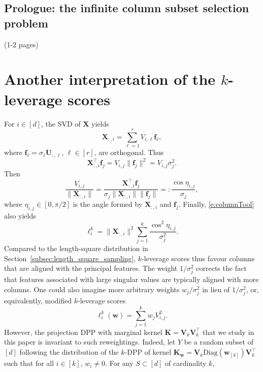 \documentclass[twoside,11pt]{book}
\numberwithin{theorem}{chapter}
\numberwithin{definition}{chapter}
\numberwithin{proposition}{chapter}
\numberwithin{corollary}{chapter}
\numberwithin{example}{chapter}
\numberwithin{lemma}{chapter}
\numberwithin{assumption}{chapter}
\DeclareMathOperator{\Tran}{\intercal}
\begin{document}
\subsection{Prologue: the infinite column subset selection problem} (1-2 pages)



\section{Another interpretation of the $k$-leverage scores}
\label{app:statisticalInterpretationOfLVSs}


For $i \in [d]$, the SVD of $\bm{X}$ yields
\begin{equation}
\bm{X}_{:,i} = \sum_{\ell = 1}^{r}V_{i,\ell}\bm{f}_{\ell},
\end{equation}
where $\bm{f}_{\ell} = \sigma_{\ell}\bm{U}_{:,\ell}$, $\ell\in[r]$, are orthogonal.
Thus
\begin{equation}
\bm{X}_{:,i}^{\Tran}\bm{f}_{j} = V_{i,j} \|\bm{f}_{j}\|^{2} = V_{i,j} \sigma_{j}^{2}.
\label{e:columnTool}
\end{equation}
Then
\begin{equation}
 \frac{V_{i,j}}{\|\bm{X}_{:,i}\|} = \frac{\bm{X}_{:,i}^{\Tran}\bm{f}_{j}}{\sigma_{j}\|\bm{X}_{:,i}\|\|\bm{f}_{j}\|} =:  \frac{\cos \eta_{i,j}}{\sigma_{j}},
\end{equation}
where $\eta_{i,j}\in[0,\pi/2]$ is the angle formed by $\bm{X}_{:,i}$ and $\bm{f}_j$. Finally, \eqref{e:columnTool} also yields
\begin{equation}
\ell^{k}_{i} = \|\bm{X}_{:,i}\|^{2} \sum_{j=1}^{k} \frac{\cos^2\eta_{i,j}}{\sigma_{j}^{2}}.
\end{equation}
Compared to the length-square distribution in Section~\ref{subsec:length_square_sampling}, $k$-leverage scores thus favour columns that are aligned with the principal features. The weight $1/\sigma_j^2$ corrects the fact that features associated with large singular values are typically aligned with more columns. One could also imagine more arbitrary weights $w_j/\sigma_j^2$ in lieu of $1/\sigma_j^2$, or, equivalently, modified $k$-leverage scores
$$\ell_i^k(\bm{w}) = \sum_{j=1}^k w_{j}V_{i,j}^2.$$
However, the projection DPP with marginal kernel $\bm{K} = \bm{V}^{}_{k}\bm{V}_{k}^{\Tran}$ that we study in this paper is invariant to such reweightings. Indeed,  let $Y$ be a random subset of $[d]$ following the distribution of the $k$-DPP of kernel $\bm{K}_{\bm{w}} = \bm{V}^{}_{k}\text{Diag}(\bm{w}_{[k]})\bm{V}_{k}^{\Tran}$ such that for all $i \in [k]$, $w_{i} \neq 0$. For any $S\subset [d]$ of cardinality $k$,
\end{document}
